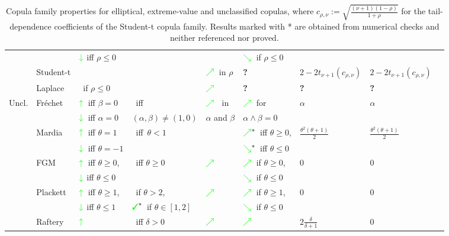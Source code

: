 \documentclass{article}
\def\of#1{\left(#1\right)} %
\newcommand{\cmark}{\color{green}{\ding{51}}\color{black}}%
\newcommand{\xmark}{\color{red}{\ding{55}}\color{black}}%
\newcommand{\gnearrow}{\color{green}{\nearrow}\color{black}}%
\newcommand{\gsearrow}{\color{green}{\searrow}\color{black}}%
\newcommand{\gdownarrow}{\color{green}{\downarrow}\color{black}}%
\newcommand{\guparrow}{\color{green}{\uparrow}\color{black}}%
\newcommand{\qmark}{\textbf{?}}%
\begin{document}
\begin{table}[tbp]
\begin{center}
{\begin{tabular}{rllllllll}
            & & $\gdownarrow$ iff $\rho \leq 0$ & & & $\gsearrow$~if $\rho \leq 0$ & & \\
            & Student-t & \xmark & \xmark & $\gnearrow$~in $\rho$ & \qmark & $2-2 t_{\nu+1}\of{c_{\rho,\nu}}$ & $2-2 t_{\nu+1}\of{c_{\rho,\nu}}$ \\
            & Laplace & \xmark~if $\rho \leq 0$ & \xmark & $\gnearrow$ & \qmark & \qmark & \qmark \\
            \bottomrule
            Uncl. & Fréchet & $\guparrow$~iff $\beta = 0$& \xmark~iff & $\gnearrow$ ~in & $\gnearrow$~for  & $\alpha$ & $\alpha$ \\
            & & $\gdownarrow$~iff $\alpha = 0$ & $(\alpha,\beta)\neq (1,0)$ & \phantom{\cmark}$\alpha$ and $\beta$ & \phantom{\cmark}$\alpha\wedge\beta=0$  & & \\
            & Mardia & $\guparrow$~iff $\theta = 1$ & \xmark~iff~$\theta <1$ & \xmark & $\gnearrow^*$~iff $\theta\geq 0$, & $\frac{\theta^{2} \left(\theta + 1\right)}{2}$ & $\frac{\theta^{2} \left(\theta + 1\right)}{2}$ \\
            & & $\gdownarrow$~iff $\theta = -1$ & & &$\gsearrow^*$~iff $\theta\leq 0$ &  & \\
            & FGM & $\guparrow$~iff $\theta \geq 0$, & \cmark~iff $\theta \geq 0$ & $\gnearrow$ & $\gnearrow$~if $\theta \geq 0$, & 0 & 0 \\
            & & $\gdownarrow$ iff $\theta \leq 0$ & & & $\gsearrow$~if $\theta \leq 0$ & & \\
            & Plackett &  $\guparrow$~iff $\theta \geq 1$, & \xmark~if $\theta > 2$, & $\gnearrow$ & $\gnearrow$~if $\theta \geq 1$, & 0 & 0 \\
            & & $\gdownarrow$ iff $\theta \leq 1$ &$\text{\cmark}^*$~if $\theta\in[1,2]$ & & $\gsearrow$~if $\theta \leq 0$ & & \\
            & Raftery & $\guparrow$ & \xmark~iff $\delta > 0$ & $\gnearrow$ & $\gnearrow$ & $2\frac{\delta}{\delta + 1}$ & 0 \\
        \end{tabular}
        }
    \end{center}
    \caption{
        Copula family properties for elliptical, extreme-value and unclassified copulas, where $c_{\rho,\nu}:= \sqrt{\frac{(\nu+1)(1-\rho)}{1+\rho}}$ for the tail-dependence coefficients of the Student-t copula family.
        Results marked with * are obtained from numerical checks and neither referenced nor proved.
    }
    \label{tab:non_arch_results}
\end{table}
\end{document}
